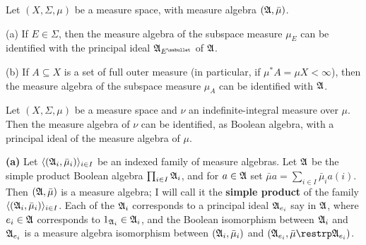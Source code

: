  Let $(X,\Sigma,\mu)$ be a measure space, with
measure algebra $(\frak A,\bar\mu)$.

(a) If $E\in\Sigma$, then the measure algebra of the subspace measure
$\mu_E$ can be identified with the principal ideal
$\frak A_{E^{\ssbullet}}$ of $\frak A$.

(b) If $A\subseteq X$ is a set of full outer measure (in
particular, if $\mu^*A=\mu X<\infty$), then the
measure algebra of the subspace measure $\mu_A$ can be identified with
$\frak A$.

Let $(X,\Sigma,\mu)$ be a measure space and $\nu$ an
indefinite-integral measure over $\mu$.
Then the measure
algebra of $\nu$ can be identified, as Boolean algebra, with a principal
ideal of the measure algebra of $\mu$.


{\bf (a)} Let $\langle(\frak A_i,\bar\mu_i)\rangle_{i\in I}$ be an
indexed family of measure
algebras.   Let $\frak A$ be the simple product Boolean algebra
$\prod_{i\in I}\frak A_i$, and for $a\in\frak A$ set
$\bar\mu a=\sum_{i\in I}\bar\mu_ia(i)$. Then $(\frak A,\bar\mu)$ is a
measure algebra; I will call it the {\bf simple product} of the family
$\langle(\frak A_i,\bar\mu_i)\rangle_{i\in I}$.   Each of the $\frak A_i$
corresponds to a principal ideal $\frak A_{e_i}$ say in $\frak A$,
where $e_i\in\frak A$ corresponds to
$1_{\frak A_i}\in\frak A_i$,
and the Boolean isomorphism between $\frak A_i$ and $\frak A_{e_i}$ is a
measure algebra isomorphism between $(\frak A_i,\bar\mu_i)$ and
$(\frak A_{e_i},\bar\mu\restrp\frak{A}_{e_i})$.

